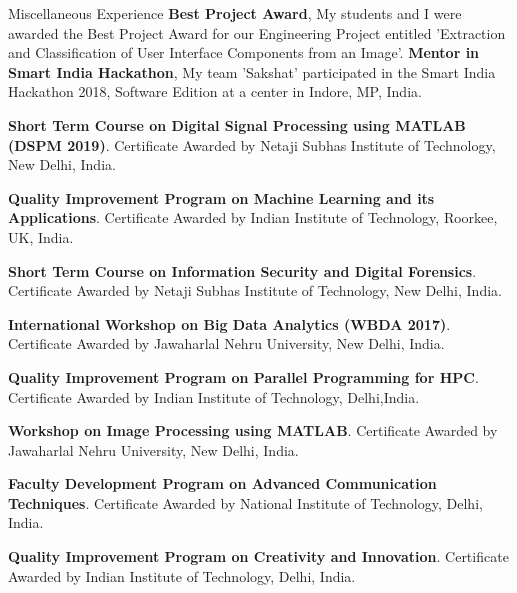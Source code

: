 \begin{rubric}{Miscellaneous Experience}
\entry*[2018] \textbf{Best Project Award}, My students and I were awarded the Best Project Award for our Engineering Project entitled 'Extraction and Classification of User Interface Components from an Image'.
%
\entry*[2018] \textbf{Mentor in Smart India Hackathon}, My team 'Sakshat' participated in the Smart India Hackathon 2018, Software Edition at a center in Indore, MP, India.

\entry*[2019] \textbf{Short Term Course on Digital Signal Processing using MATLAB (DSPM 2019)}. Certificate Awarded by Netaji Subhas Institute of Technology, New Delhi, India.

\entry*[2018] \textbf{Quality Improvement Program on Machine Learning and its Applications}. Certificate Awarded by Indian Institute of Technology, Roorkee, UK, India.

\entry*[2017] \textbf{Short Term Course on Information Security and Digital Forensics}. Certificate Awarded by Netaji Subhas Institute of Technology, New Delhi, India.

\entry*[2017] \textbf{International Workshop on Big Data Analytics (WBDA 2017)}. Certificate Awarded by Jawaharlal Nehru University, New Delhi, India.

\entry*[2016] \textbf{Quality Improvement Program on Parallel Programming for HPC}. Certificate Awarded by Indian Institute of Technology, Delhi,India.

\entry*[2016] \textbf{Workshop on Image Processing using MATLAB}. Certificate Awarded by Jawaharlal Nehru University, New Delhi, India.

\entry*[2013] \textbf{Faculty Development Program on Advanced Communication Techniques}. Certificate Awarded by National Institute of Technology, Delhi, India.

\entry*[2012] \textbf{Quality Improvement Program on Creativity and Innovation}. Certificate Awarded by Indian Institute of Technology, Delhi, India.
\end{rubric}